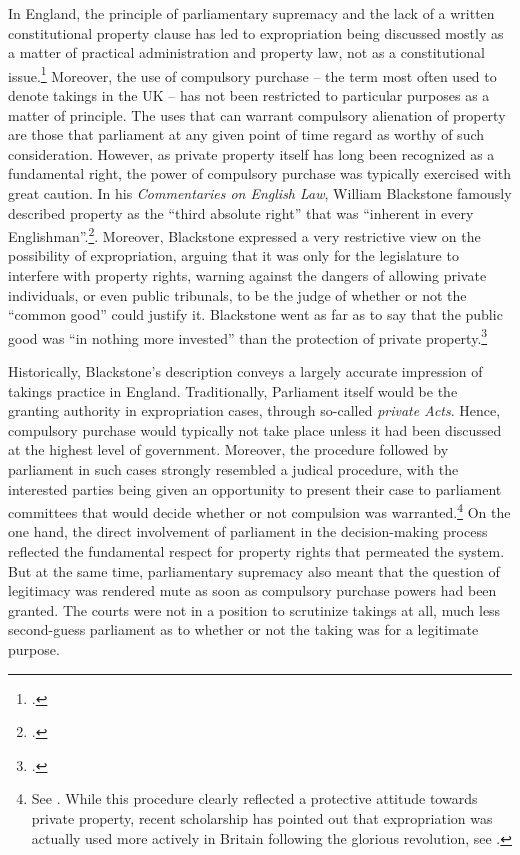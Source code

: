 In England, the principle of parliamentary supremacy and the lack of a written constitutional property clause has led to expropriation being discussed mostly as a matter of practical administration and property law, not as a constitutional issue.\footcite{taggart98} Moreover, the use of compulsory purchase -- the term most often used to denote takings in the UK -- has not been restricted to particular purposes as a matter of principle. The uses that can warrant compulsory alienation of property are those that parliament at any given point of time regard as worthy of such consideration. However, as private property itself has long been recognized as a fundamental right, the power of compulsory purchase was typically exercised with great caution. In his {\it Commentaries on English Law}, William Blackstone famously described property as the ``third absolute right'' that was ``inherent in every Englishman''.\footcite[134-135]{blackstone79}.  Moreover, Blackstone expressed a very restrictive view on the possibility of expropriation, arguing that it was only for the legislature to interfere with property rights, warning against the dangers of allowing private individuals, or even public tribunals, to be the judge of whether or not the ``common good'' could justify it. Blackstone went as far as to say that the public good was ``in nothing more invested'' than the protection of private property.\footcite[134-135]{blackstone79}

Historically, Blackstone's description conveys a largely accurate impression of takings practice in England. Traditionally, Parliament itself would be the granting authority in expropriation cases, through so-called {\it private Acts}. Hence, compulsory purchase would typically not take place unless it had been discussed at the highest level of government. Moreover, the procedure followed by parliament in such cases strongly resembled a judical procedure, with the interested parties being given an opportunity to present their case to parliament committees that would decide whether or not compulsion was warranted.\footnote{See \cite[13-16]{allen00}. While this procedure clearly reflected a protective attitude towards private property, recent scholarship has pointed out that expropriation was actually used more actively in Britain following the glorious revolution, see \cite{hoppit11}.} On the one hand, the direct involvement of parliament in the decision-making process reflected the fundamental respect for property rights that permeated the system. But at the same time, parliamentary supremacy also meant that the question of legitimacy was rendered mute as soon as compulsory purchase powers had been granted. The courts were not in a position to scrutinize takings at all, much less second-guess parliament as to whether or not the taking was for a legitimate purpose.

